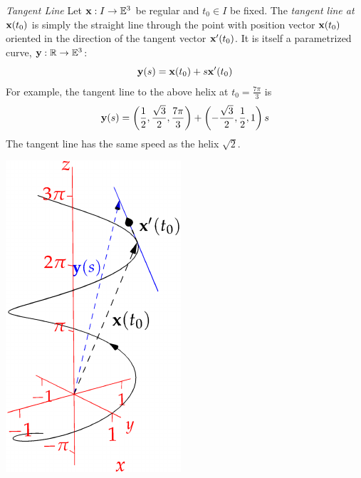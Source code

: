 \begin{tcolorbox}[exstyle,title={}]
\begin{description}
\begin{minipage}[t]{0.72\linewidth}\vspace{0pt}
  \item[\normalfont\emph{Tangent Line}] Let ${\mathbf{x}}:I\to\mathbb{E}^3$ be regular and $t_0\in I$ be fixed. The \emph{tangent line at ${\mathbf{x}}(t_0)$} is simply the straight line through the point with position vector ${\mathbf{x}}(t_0)$ oriented in the direction of the tangent vector ${\mathbf{x}}'(t_0)$. It is itself a parametrized curve, ${\mathbf{y}}:\mathbb{R}\to\mathbb{E}^3$:
	\[{\mathbf{y}}(s)={\mathbf{x}}(t_0)+s{\mathbf{x}}'(t_0)\]
	For example, the tangent line to the above helix at $t_0=\frac{7\pi}3$ is
	\[{\mathbf{y}}(s)=\left(\frac 12,\frac{\sqrt 3}2,\frac{7\pi}3\right)+\left(-\frac{\sqrt 3}2,\frac 12,1\right)s
	\]
	The tangent line has the same speed as the helix $\sqrt 2$.
\end{minipage}\hfill\begin{minipage}[t]{0.27\linewidth}\vspace{0pt}
	\flushright\href{http://www.math.uci.edu/~ndonalds/math162a/curves-helixnewtan.html}{\includegraphics[scale=0.95]{curves-helixnewtan}}
\end{minipage}\par



\end{description}
\end{tcolorbox}
